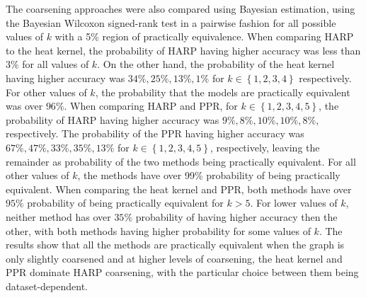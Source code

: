 The coarsening approaches were also compared using Bayesian estimation, using the Bayesian Wilcoxon signed-rank test in a pairwise fashion for all possible values of \( k \) with a 5\% region of practically equivalence. When comparing HARP to the heat kernel, the probability of HARP having higher accuracy was less than \( 3\% \) for all values of \( k \). On the other hand, the probability of the heat kernel having higher accuracy was \( 34\%, 25\%, 13\%, 1\% \) for \( k \in \left\{ 1, 2, 3, 4 \right\} \) respectively. For other values of \( k \), the probability that the models are practically equivalent was over \( 96\% \). When comparing HARP and PPR, for \( k \in \left\{ 1, 2, 3, 4, 5 \right\} \), the probability of HARP having higher accuracy was \( 9\%, 8\%, 10\%, 10\%, 8\% \), respectively. The probability of the PPR having higher accuracy was \( 67\%, 47\%, 33\%, 35\%, 13\% \) for \( k \in \left\{ 1, 2, 3, 4, 5 \right\} \), respectively, leaving the remainder as probability of the two methods being practically equivalent. For all other values of \( k \), the methods have over 99\% probability of being practically equivalent. When comparing the heat kernel and PPR, both methods have over \( 95\% \) probability of being practically equivalent for \( k > 5 \). For lower values of \( k \), neither method has over \( 35\% \) probability of having higher accuracy then the other, with both methods having higher probability for some values of \( k \). The results show that all the methods are practically equivalent when the graph is only slightly coarsened and at higher levels of coarsening, the heat kernel and PPR dominate HARP coarsening, with the particular choice between them being dataset-dependent.
